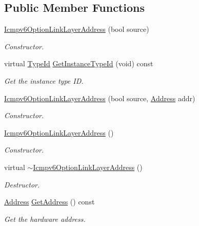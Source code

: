 \subsection*{Public Member Functions}
\begin{DoxyCompactItemize}
\item 
\hyperlink{classns3_1_1Icmpv6OptionLinkLayerAddress_a00cb299171718c4f2e268b5afe68f4e3}{Icmpv6\+Option\+Link\+Layer\+Address} (bool source)
\begin{DoxyCompactList}\small\item\em Constructor. \end{DoxyCompactList}\item 
virtual \hyperlink{classns3_1_1TypeId}{Type\+Id} \hyperlink{classns3_1_1Icmpv6OptionLinkLayerAddress_ab63ea7b6809039d762b8904d7a4a35f8}{Get\+Instance\+Type\+Id} (void) const 
\begin{DoxyCompactList}\small\item\em Get the instance type ID. \end{DoxyCompactList}\item 
\hyperlink{classns3_1_1Icmpv6OptionLinkLayerAddress_abb9aefc30c568584489d2fbfe408972d}{Icmpv6\+Option\+Link\+Layer\+Address} (bool source, \hyperlink{classns3_1_1Address}{Address} addr)
\begin{DoxyCompactList}\small\item\em Constructor. \end{DoxyCompactList}\item 
\hyperlink{classns3_1_1Icmpv6OptionLinkLayerAddress_a3988e469ac759d132659cd6dc6234c7a}{Icmpv6\+Option\+Link\+Layer\+Address} ()
\begin{DoxyCompactList}\small\item\em Constructor. \end{DoxyCompactList}\item 
virtual \hyperlink{classns3_1_1Icmpv6OptionLinkLayerAddress_a7d0da14325b083b08a209bdddfc811ba}{$\sim$\+Icmpv6\+Option\+Link\+Layer\+Address} ()
\begin{DoxyCompactList}\small\item\em Destructor. \end{DoxyCompactList}\item 
\hyperlink{classns3_1_1Address}{Address} \hyperlink{classns3_1_1Icmpv6OptionLinkLayerAddress_abde7b8f39882da8d506856e6dd67700a}{Get\+Address} () const 
\begin{DoxyCompactList}\small\item\em Get the hardware address. \end{DoxyCompactList}\item 

\end{DoxyCompactItemize}
